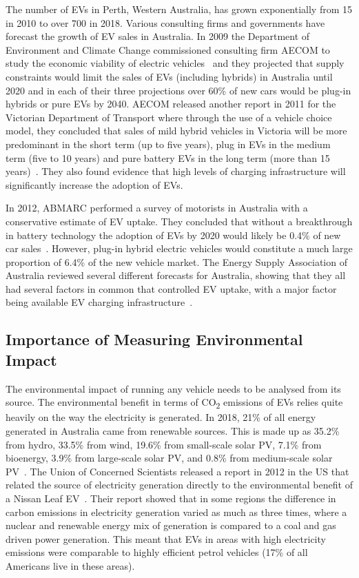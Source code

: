 The number of EVs in Perth, Western Australia, has grown exponentially from 15 in 2010 to over 700 in 2018.  Various consulting firms and governments have forecast the growth of EV sales in Australia. In 2009 the Department of Environment and Climate Change commissioned consulting firm AECOM to study the economic viability of electric vehicles~\cite{aecom_australia_economic_2009} and they projected that supply constraints would limit the sales of EVs (including hybrids) in Australia until 2020 and in each of their three projections over 60\% of new cars would be plug-in hybrids or pure EVs by 2040. AECOM released another report in 2011 for the Victorian Department of Transport where through the use of a vehicle choice model, they concluded that sales of mild hybrid vehicles in Victoria will be more predominant in the short term (up to five years), plug in EVs in the medium term (five to 10 years) and pure battery EVs in the long term (more than 15 years)~\cite{kinghorn_forecast_2011}. They also found evidence that high levels of charging infrastructure will significantly increase the adoption of EVs. 

In 2012, ABMARC performed a survey of motorists in Australia with a conservative estimate of EV uptake. They concluded that without a breakthrough in battery technology the adoption of EVs by 2020 would likely be 0.4\% of new car sales~\cite{roberts_media_2012}. However, plug-in hybrid electric vehicles would constitute a much large proportion of 6.4\% of the new vehicle market.
The Energy Supply Association of Australia reviewed several different forecasts for Australia, showing that they all had several factors in common that controlled EV uptake, with a major factor being available EV charging infrastructure~\cite{energy_supply_association_of_australia_sparking_2013}.  

\subsection{Importance of Measuring Environmental Impact}
The environmental impact of running any vehicle needs to be analysed from its source. The environmental benefit in terms of CO\textsubscript{2} emissions of EVs relies quite heavily on the way the electricity is generated. In 2018, 21\% of all energy generated in Australia came from renewable sources. This is made up as 35.2\% from hydro, 33.5\% from wind, 19.6\% from small-scale solar PV, 7.1\% from bioenergy, 3.9\% from large-scale solar PV, and 0.8\% from medium-scale solar PV~\cite{clean_energy_council_clean_2019}. The Union of Concerned Scientists released a report in 2012 in the US that related the source of electricity generation directly to the environmental benefit of a Nissan Leaf EV~\cite{anair_state_2012}. Their report showed that in some regions the difference in carbon emissions in electricity generation varied as much as three times, where a nuclear and renewable energy mix of generation is compared to a coal and gas driven power generation. This meant that EVs in areas with high electricity emissions were comparable to highly efficient petrol vehicles (17\% of all Americans live in these areas).

